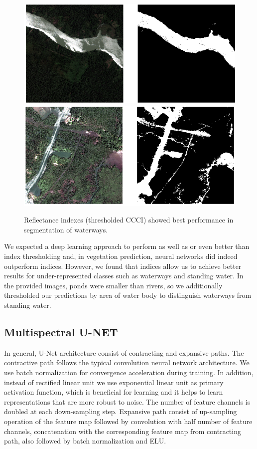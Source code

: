 \documentclass[10pt,twocolumn,letterpaper]{article}
\begin{document}
\begin{figure}[!h]
	\captionsetup{justification=centering}
	\centering
	\includegraphics[scale=0.27]{water}
	\includegraphics[scale=0.27]{water2}
	\caption{ Reflectance indexes (thresholded CCCI) showed best performance in segmentation of waterways.}
	\label{fig:ccci}
\end{figure}

We expected a deep learning approach to perform as well as or even better than index thresholding and, in vegetation prediction, neural networks did indeed outperform indices. However, we found that indices allow us to achieve better results for under-represented classes such as waterways and standing water. In the provided images, ponds were smaller than rivers, so we additionally thresholded our predictions by area of water body to distinguish waterways from standing water.

\subsection{Multispectral U-NET}

In general, U-Net architecture consist of contracting and expansive paths. The contractive path follows the typical convolution neural network architecture.
We use batch normalization \cite{batchnorm} for convergence acceleration during training. In addition, instead of rectified linear unit we use exponential linear \cite{elu} unit as primary activation function, which is beneficial for learning and it helps to learn representations that are more robust to noise. The number of feature channels is doubled at each down-sampling step. Expansive path consist of up-sampling operation of the feature map followed by convolution with half number of feature channels, concatenation with the corresponding feature map from contracting path, also followed by batch normalization and ELU. 
\end{document}

